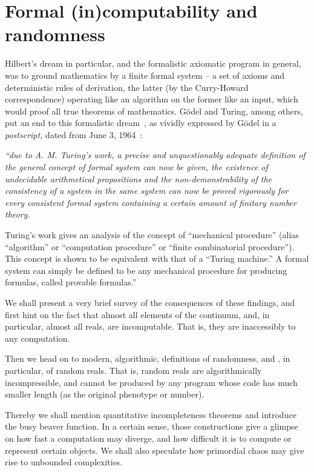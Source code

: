 \chapter{Formal (in)computability and randomness}
\label{2016-pu-book-chapter-ranform}

Hilbert's dream in particular, and the formalistic axiomatic program in general, was to ground mathematics
by a finite formal system --
a set of axioms and deterministic rules of derivation, the latter (by the Curry-Howard correspondence)
operating like an algorithm on the former like an input, which
would proof all true theorems of mathematics.
G\"odel and Turing, among others, put an end to this formalistic dream~\cite{Heijenoort-fftg,davis}, as vividly
expressed by G\"odel   in a {\em postscript,} dated from  June 3, 1964~\cite[p.~369-370]{godel-ges1}:
 {\em ``due to A. M. Turing's work,
 a precise and unquestionably
 adequate definition of the general concept of formal system can now be
 given, the existence of undecidable arithmetical propositions and the
 non-demonstrability of the consistency of a system in the same system
 can now be proved rigorously for {\em every} consistent formal system
 containing a certain amount of finitary number theory.

 Turing's work gives an analysis of the
 concept of ``mechanical
 procedure'' (alias ``algorithm'' or ``computation procedure'' or
 ``finite combinatorial procedure''). This concept is shown to be
 equivalent with that of a ``Turing machine.'' A formal system can
 simply be defined to be any mechanical procedure for producing
 formulas, called provable formulas.''
}


We shall present a very brief survey of the consequences of these findings,
and first hint on the fact that almost all elements of the continuum, and, in particular, almost all reals, are incomputable.
That is, they are inaccessibly to any computation.

Then we head on to modern, algorithmic, definitions of randomness, and , in particular, of random reals.
That is, random reals are algorithmically incompressible, and cannot
be produced by any program whose code has much smaller length (as the original phenotype or number).

Thereby we shall mention quantitative incompleteness theorems and introduce the busy beaver function. In a certain sense,
those constructions give a glimpse on how fast a computation may diverge, and how difficult it is to compute or represent certain objects.
We shall also speculate how primordial chaos may give rise to unbounded complexities.


